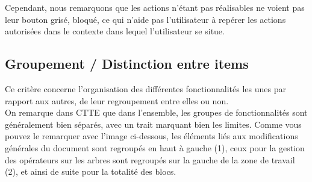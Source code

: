 \documentclass[12pt, a4paper]{article}
\begin{document}
Cependant, nous remarquons que les actions n'étant pas réalisables ne voient pas leur bouton grisé, bloqué, ce qui n'aide pas l'utilisateur à repérer les actions autorisées dans le contexte dans lequel l'utilisateur se situe.
\newpage
\textcolor{NavyBlue}{\subsection{Groupement / Distinction entre items}}
Ce critère concerne l'organisation des différentes fonctionnalités les unes par rapport aux autres, de leur regroupement entre elles ou non.\\


On remarque dans CTTE que dans l'ensemble, les groupes de fonctionnalités sont généralement bien séparés, avec un trait marquant bien les limites. Comme vous pouvez le remarquer avec l'image ci-dessous, les éléments liés aux modifications générales du document sont regroupés en haut à gauche (1), ceux pour la gestion des opérateurs sur les arbres sont regroupés sur la gauche de la zone de travail (2), et ainsi de suite pour la totalité des blocs. 
\end{document}
